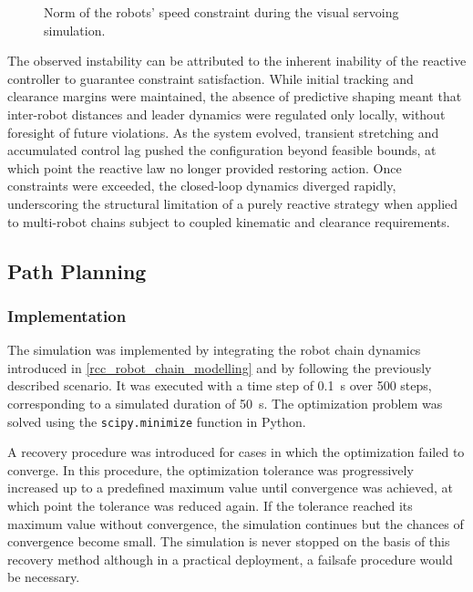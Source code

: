 \begin{figure}
	\centering
	\caption{Norm of the robots' speed constraint during the visual servoing simulation.}
	\label{rcc_s_rc_r_robots_speed}
\end{figure}

The observed instability can be attributed to the inherent inability of the reactive controller to
guarantee constraint satisfaction. While initial tracking and clearance margins were maintained,
the absence of predictive shaping meant that inter-robot distances and leader dynamics were
regulated only locally, without foresight of future violations. As the system evolved, transient
stretching and accumulated control lag pushed the configuration beyond feasible bounds, at which
point the reactive law no longer provided restoring action. Once constraints were exceeded, the
closed-loop dynamics diverged rapidly, underscoring the structural limitation of a purely reactive
strategy when applied to multi-robot chains subject to coupled kinematic and clearance
requirements.

\subsection{Path Planning}
\label{rcc_s_path_planning}

\subsubsection{Implementation}
\label{rcc_s_pp_implementation}

The simulation was implemented by integrating the robot chain dynamics introduced in
\cref{rcc_robot_chain_modelling} and by following the previously described scenario. It was
executed with a time step of \qty{0.1}{\second} over \num{500} steps, corresponding to a simulated
duration of \qty{50}{\second}. The optimization problem was solved using the
\texttt{scipy.minimize} function in Python.

A recovery procedure was introduced for cases in which the optimization failed to converge. In this
procedure, the optimization tolerance was progressively increased up to a predefined maximum value
until convergence was achieved, at which point the tolerance was reduced again. If the tolerance
reached its maximum value without convergence, the simulation continues but the chances of
convergence become small. The simulation is never stopped on the basis of this recovery method
although in a practical deployment, a failsafe procedure would be necessary.

